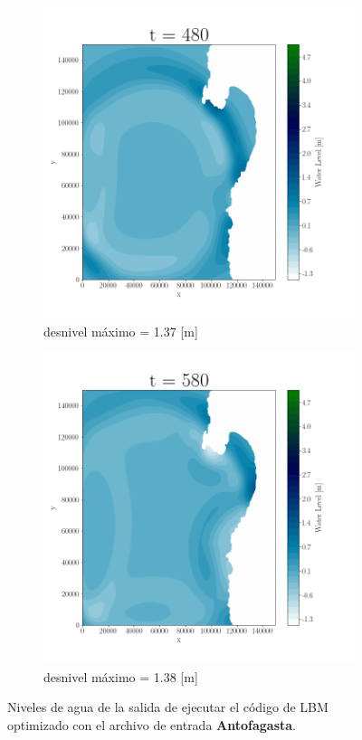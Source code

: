 \begin{figure}[H]
\begin{subfigure}[b]{.4\linewidth}
\includegraphics[width=\linewidth]{Figures/Plots/Antofa5.png}
\caption{desnivel máximo = 1.37 [m]}
\end{subfigure}
\begin{subfigure}[b]{.4\linewidth}
\includegraphics[width=\linewidth]{Figures/Plots/Antofa6.png}
\caption{desnivel máximo = 1.38 [m]}
\end{subfigure}
\caption{Niveles de agua de la salida de ejecutar el código de LBM optimizado con el archivo de entrada \textbf{Antofagasta}.}
\label{fig:25}
\end{figure}

